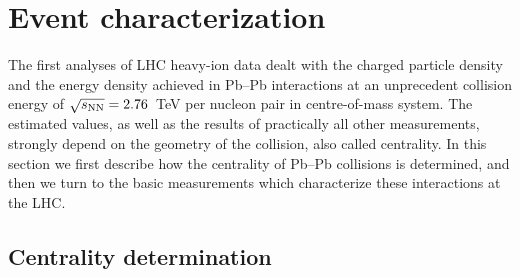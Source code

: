 \section{Event characterization}
\label{secks:eventchar}

The first analyses of LHC heavy-ion data dealt with the charged particle density and the energy density achieved in Pb--Pb interactions at an unprecedent collision energy of $\sqrt{s_{\rm NN}} = 2.76$~TeV per nucleon pair in centre-of-mass system. The estimated values, as well as the results of practically all other measurements, strongly depend on the geometry of the collision, also called centrality.
In this section we first describe how the centrality of Pb--Pb collisions is determined, and then we turn to the basic measurements which characterize these interactions at the LHC.



\subsection{Centrality determination}
\label{subsecks:centrality}

